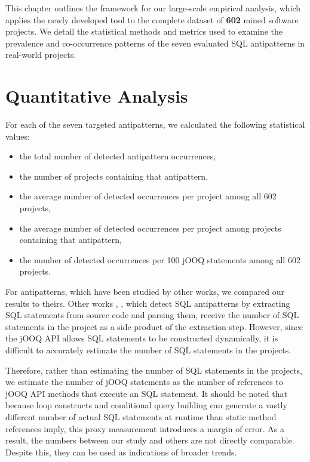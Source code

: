 This chapter outlines the framework for our large-scale empirical analysis, which applies the newly developed tool to the complete dataset of \textbf{602} mined software projects. We detail the statistical methods and metrics used to examine the prevalence and co-occurrence patterns of the seven evaluated SQL antipatterns in real-world projects.

\section{Quantitative Analysis}\label{sec:projectAnalysisQuantitative}

For each of the seven targeted antipatterns, we calculated the following statistical values:

\begin{itemize}
    \item the total number of detected antipattern occurrences,
    \item the number of projects containing that antipattern,
    \item the average number of detected occurrences per project among all \num{602} projects,
    \item the average number of detected occurrences per project among projects containing that antipattern,
    \item the number of detected occurrences per \num{100} jOOQ statements among all \num{602} projects.
\end{itemize}

For antipatterns, which have been studied by other works, we compared our results to theirs. Other works , , which detect SQL antipatterns by extracting SQL statements from source code and parsing them, receive the number of SQL statements in the project as a side product of the extraction step. However, since the jOOQ API allows SQL statements to be constructed dynamically, it is difficult to accurately estimate the number of SQL statements in the projects. 

Therefore, rather than estimating the number of SQL statements in the projects, we estimate the number of jOOQ statements as the number of references to jOOQ API methods that execute an SQL statement. It should be noted that because loop constructs and conditional query building can generate a vastly different number of actual SQL statements at runtime than static method references imply, this proxy measurement introduces a margin of error. As a result, the numbers between our study and others are not directly comparable. Despite this, they can be used as indications of broader trends.

